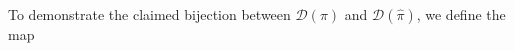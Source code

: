 \documentclass[12pt]{amsart}
\theoremstyle{definition}
\numberwithin{equation}{section}
\newcommand{\D}{\mathcal{D}}
\begin{document}


To demonstrate the claimed bijection between $\D(\pi)$ and $\D(\hat\pi)$, we define the map
\end{document}

